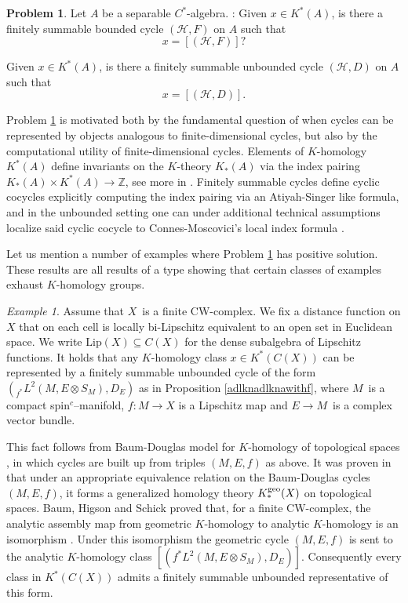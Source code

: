 \documentclass[a4paper,reqno]{amsart}
\numberwithin{equation}{section}
\def\Z{\mathbb{Z}}
\theoremstyle{definition}
\newtheorem{problem}[thm]{Problem}
\theoremstyle{remark}
\newtheorem{example}[thm]{Example}
\begin{document}
\begin{problem}
\label{summabilityprob}
Let $A$ be a separable $C^*$-algebra. \newline
{}: Given $x\in K^*(A)$, is there a finitely summable bounded cycle $(\mathcal{H},F)$ on $A$ such that 
$$x=[(\mathcal{H},F)]?$$




 Given $x\in K^*(A)$, is there a finitely summable unbounded cycle $(\mathcal{H},D)$ on $A$ such that 
$$x=[(\mathcal{H},D)].$$


\end{problem}


Problem \ref{summabilityprob} is motivated both by the fundamental question of when cycles can be represented by objects analogous to finite-dimensional cycles, but also by the computational utility of finite-dimensional cycles. Elements of $K$-homology $K^*(A)$ define invariants on the $K$-theory $K_*(A)$ via the index pairing $K_*(A)\times K^*(A)\to \Z$, see more in \cite{connesncdg,redbook,connesmoscovici,levithesis}. Finitely summable cycles define cyclic cocycles \cite{connesncdg,redbook} explicitly computing the index pairing via an Atiyah-Singer like formula, and in the unbounded setting one can under additional technical assumptions localize said cyclic cocycle to Connes-Moscovici's local index formula \cite{connesmoscovici}.


Let us mention a number of examples where Problem \ref{summabilityprob} has  positive solution. These results are all results of a type showing that certain classes of examples exhaust $K$-homology groups.


\begin{example}
Assume that $X$ is a finite CW-complex. We fix a distance function on $X$ that on each cell is locally bi-Lipschitz equivalent to an open set in Euclidean space. We write $\mathrm{Lip}(X)\subseteq C(X)$ for the dense subalgebra of Lipschitz functions. It holds that any $K$-homology class $x\in K^*(C(X))$ can be represented by a finitely summable unbounded cycle of the form $(_{f^*}L^2(M,E\otimes S_M),D_E)$ as in Proposition \ref{adlknadlknawithf}, where $M$ is a compact spin$^c$–manifold, $f:M\to X$ is a Lipschitz map and $E\to M$ is a complex vector bundle.  


This fact follows from Baum-Douglas model for $K$-homology of topological spaces \cite{BaumDouglas1982}, in which cycles are built up from triples $(M,E,f)$ as above. It was proven in \cite{BaumHigsonSchick2007} that under an appropriate equivalence relation on the Baum-Douglas cycles $(M,E,f)$, it forms a generalized homology theory $K_*^{\rm geo}(X)$ on topological spaces. Baum, Higson and Schick proved that, for a finite CW-complex, the analytic assembly map from geometric $K$-homology to analytic $K$-homology is an isomorphism \cite{BaumHigsonSchick2007}. Under this isomorphism the geometric cycle $(M,E,f)$ is sent to the analytic $K$-homology class $[(f^*L^2(M,E\otimes S_M),D_E)]$. Consequently every class in $K^*(C(X))$ admits a finitely summable unbounded representative of this form.
\end{example}
\end{document}
